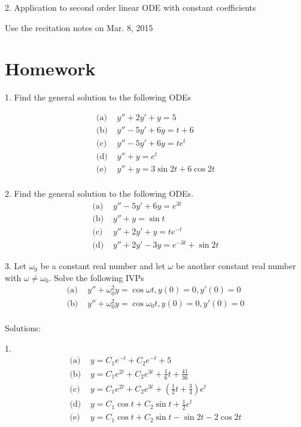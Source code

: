 \documentclass[11pt]{article}
\begin{document}
2. Application to second order linear ODE with constant coefficients

Use the recitation notes on Mar. 8, 2015

\newpage 

\section*{Homework}

1. Find the general solution to the following ODEs

$$\begin{aligned}
\text{(a)  }&  y'' + 2y' + y = 5\\
\text{(b)  }&  y'' - 5y' + 6y = t+6  \\
\text{(c)  }&  y'' - 5y' + 6y = te^t\\
\text{(d)  }&  y'' + y = e^t\\
\text{(e)  }&  y'' + y = 3\sin 2t + 6 \cos 2t  \\
\end{aligned}$$

2. Find the general solution to the following ODEs. 
$$\begin{aligned}
\text{(a)  }&  y'' - 5y' + 6y = e^{3t}\\
\text{(b)  }&  y'' + y = \sin t \\
\text{(c)  }&  y'' + 2y' + y = te^{-t}\\
\text{(d)  }&  y'' + 2y' - 3y = e^{-3t} + \sin 2t
\end{aligned}$$

3. Let $\omega_0$ be a constant real number and let $\omega$ be another constant real number with $\omega \neq \omega_0$. Solve the following IVPs
$$\begin{aligned}
\text{(a)  }&  y'' + \omega_0^2 y = \cos \omega t, y(0)=0, y'(0) = 0\\
\text{(b)  }&  y'' + \omega_0^2 y = \cos \omega_0 t, y(0)=0, y'(0) = 0\\
\end{aligned}$$

Solutions:

1. 
$$
\begin{aligned}
\text{(a)  }&  y= C_1 e^{-t} + C_2 e^{-t}+5\\
\text{(b)  }&  y= C_1 e^{2t}+ C_2e^{3t} + \frac 1 6 t + \frac{41}{36} \\
\text{(c)  }&  y =C_1 e^{2t}+ C_2 e^{3t} + (\frac 1 2 t+\frac 3 4)e^t\\
\text{(d)  }&  y = C_1 \cos t + C_2 \sin t + \frac 1 2 e^t\\
\text{(e)  }&  y = C_1 \cos t + C_2 \sin t - \sin 2t - 2 \cos 2t \\
\end{aligned}
$$
\end{document}
